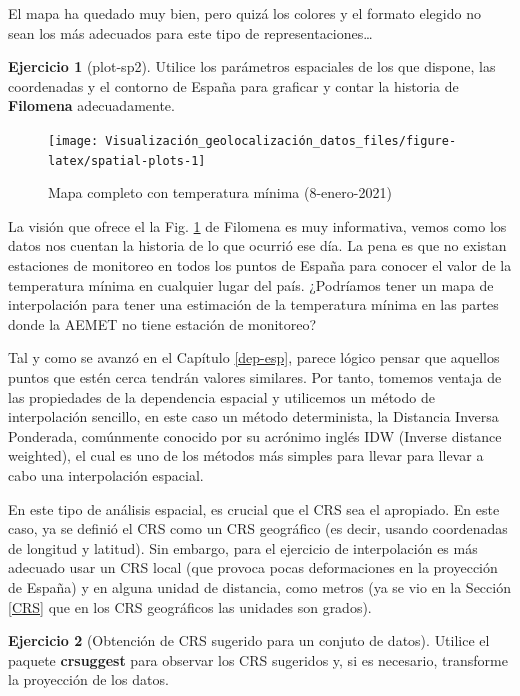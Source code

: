 \documentclass[
]{report}
\theoremstyle{definition}
\theoremstyle{definition}
\theoremstyle{definition}
\newtheorem{exercise}{Ejercicio}[chapter]
\theoremstyle{definition}
\theoremstyle{remark}
\begin{document}
El mapa ha quedado muy bien, pero quizá los colores y el formato elegido no sean
los más adecuados para este tipo de representaciones\ldots{}

\begin{exercise}[plot-sp2]
Utilice los parámetros espaciales de los que dispone, las coordenadas y el
contorno de España para graficar y contar la historia de \textbf{Filomena}
adecuadamente.
\end{exercise}

\begin{figure}

{\centering \texttt{[image: Visualización\_geolocalización\_datos\_files/figure-latex/spatial-plots-1]} 

}

\caption{Mapa completo con temperatura mínima (8-enero-2021)}\label{fig:spatial-plots}
\end{figure}

La visión que ofrece el la Fig. \ref{fig:spatial-plots} de Filomena es muy
informativa, vemos como los datos nos cuentan la historia de lo que ocurrió ese
día. La pena es que no existan estaciones de monitoreo en todos los puntos de
España para conocer el valor de la temperatura mínima en cualquier lugar del
país. ¿Podríamos tener un mapa de interpolación para tener una estimación de la
temperatura mínima en las partes donde la AEMET no tiene estación de monitoreo?

Tal y como se avanzó en el Capítulo \ref{dep-esp}, parece lógico pensar que
aquellos puntos que estén cerca tendrán valores similares. Por tanto, tomemos
ventaja de las propiedades de la dependencia espacial y utilicemos un método de
interpolación sencillo, en este caso un método determinista, la Distancia
Inversa Ponderada, comúnmente conocido por su acrónimo inglés IDW (Inverse
distance weighted), el cual es uno de los métodos más simples para llevar para
llevar a cabo una interpolación espacial.

En este tipo de análisis espacial, es crucial que el CRS sea el apropiado. En
este caso, ya se definió el CRS como un CRS geográfico (es decir, usando
coordenadas de longitud y latitud). Sin embargo, para el ejercicio de
interpolación es más adecuado usar un CRS local (que provoca pocas deformaciones
en la proyección de España) y en alguna unidad de distancia, como metros (ya se
vio en la Sección \ref{CRS} que en los CRS geográficos las unidades son
grados).

\begin{exercise}[Obtención de CRS sugerido para un conjuto de datos]
\protect\hypertarget{exr:ex11}{}\label{exr:ex11}Utilice el paquete \textbf{crsuggest} para observar los CRS sugeridos y, si es
necesario, transforme la proyección de los datos.
\end{exercise}
\end{document}
